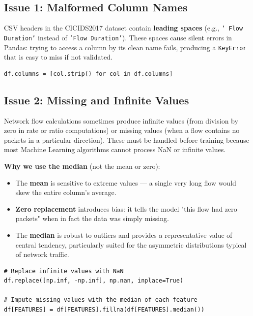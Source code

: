 \subsection{Issue 1: Malformed Column Names}

CSV headers in the CICIDS2017 dataset contain \textbf{leading spaces} (e.g., \texttt{' Flow Duration'} instead of \texttt{'Flow Duration'}). These spaces cause silent errors in Pandas: trying to access a column by its clean name fails, producing a \texttt{KeyError} that is easy to miss if not validated.

\begin{lstlisting}[caption={Stripping leading spaces from column names}]
df.columns = [col.strip() for col in df.columns]
\end{lstlisting}

\subsection{Issue 2: Missing and Infinite Values}

Network flow calculations sometimes produce infinite values (from division by zero in rate or ratio computations) or missing values (when a flow contains no packets in a particular direction). These must be handled before training because most Machine Learning algorithms cannot process NaN or infinite values.

\textbf{Why we use the median} (not the mean or zero):
\begin{itemize}
    \item The \textbf{mean} is sensitive to extreme values --- a single very long flow would skew the entire column's average.
    \item \textbf{Zero replacement} introduces bias: it tells the model "this flow had zero packets" when in fact the data was simply missing.
    \item The \textbf{median} is robust to outliers and provides a representative value of central tendency, particularly suited for the asymmetric distributions typical of network traffic.
\end{itemize}

\begin{lstlisting}[caption={Handling infinite and missing values}]
# Replace infinite values with NaN
df.replace([np.inf, -np.inf], np.nan, inplace=True)

# Impute missing values with the median of each feature
df[FEATURES] = df[FEATURES].fillna(df[FEATURES].median())
\end{lstlisting}

